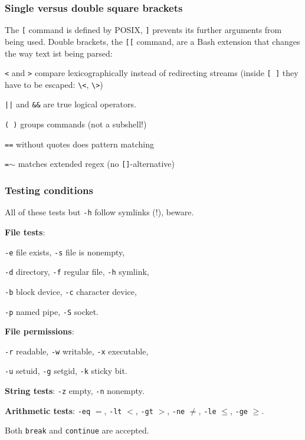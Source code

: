 \subsubsection{Single versus double square brackets}
The \texttt{[} command is defined by POSIX, \texttt{]} prevents its further arguments from being used.
Double brackets, the \texttt{[[} command, are a Bash extension that changes the way text ist being parsed:
\begin{compactenum}
\item \texttt{<} and \texttt{>} compare lexicographically instead of redirecting streams (inside \texttt{[ ]} they have to be escaped: \texttt{\textbackslash{}<}, \texttt{\textbackslash{}>})
\item \texttt{||} and \texttt{\&\&} are true logical operators.
\item \texttt{( )} groups commands (not a subshell!)
\item \texttt{==} without quotes does pattern matching
\item \texttt{=$\sim$} matches extended regex (no \texttt{[]}-alternative)
\end{compactenum}

\subsubsection{Testing conditions}
All of these tests but \texttt{-h} follow symlinks (!), beware.

\begin{compactenum}
\item \textbf{File tests}:
\begin{compactenum}
    \item \texttt{-e} file exists,
    \texttt{-s} file is nonempty,
    \item \texttt{-d} directory,
    \texttt{-f} regular file,
    \texttt{-h} symlink,
    \item \texttt{-b} block device,
    \texttt{-c} character device,
    \item \texttt{-p} named pipe,
    \texttt{-S} socket.
\end{compactenum}
\item \textbf{File permissions}:
\begin{compactenum}
    \item \texttt{-r} readable,
    \texttt{-w} writable,
    \texttt{-x} executable,
    \item \texttt{-u} setuid,
    \texttt{-g} setgid,
    \texttt{-k} sticky bit.
\end{compactenum}
\item \textbf{String tests}: \texttt{-z} empty, \texttt{-n} nonempty.
\item \textbf{Arithmetic tests}:
  \texttt{-eq} $=$,
  \texttt{-lt} $<$,
  \texttt{-gt} $>$,
  \texttt{-ne} $\neq$,
  \texttt{-le} $\le$,
  \texttt{-ge} $\ge$.
\end{compactenum}

Both \texttt{break} and \texttt{continue} are accepted.



%